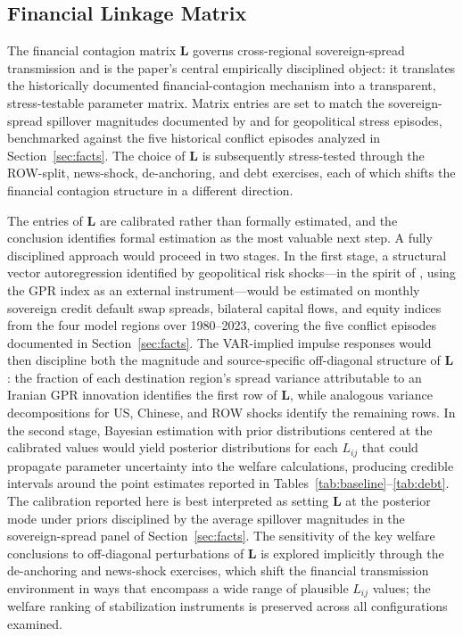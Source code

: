 \documentclass[12pt]{article}
\begin{document}
\subsection{Financial Linkage Matrix}

The financial contagion matrix $\mathbf{L}$ governs cross-regional sovereign-spread transmission and is the paper's central empirically disciplined object: it translates the historically documented financial-contagion mechanism into a transparent, stress-testable parameter matrix. Matrix entries are set to match the sovereign-spread spillover magnitudes documented by \citet{longstaff2011financial} and \citet{caldara2022measuring} for geopolitical stress episodes, benchmarked against the five historical conflict episodes analyzed in Section~\ref{sec:facts}. The choice of $\mathbf{L}$ is subsequently stress-tested through the ROW-split, news-shock, de-anchoring, and debt exercises, each of which shifts the financial contagion structure in a different direction.

The entries of $\mathbf{L}$ are calibrated rather than formally estimated, and the conclusion identifies formal estimation as the most valuable next step. A fully disciplined approach would proceed in two stages. In the first stage, a structural vector autoregression identified by geopolitical risk shocks---in the spirit of \citet{caldara2022measuring}, using the GPR index as an external instrument---would be estimated on monthly sovereign credit default swap spreads, bilateral capital flows, and equity indices from the four model regions over 1980--2023, covering the five conflict episodes documented in Section~\ref{sec:facts}. The VAR-implied impulse responses would then discipline both the magnitude and source-specific off-diagonal structure of $\mathbf{L}$: the fraction of each destination region's spread variance attributable to an Iranian GPR innovation identifies the first row of $\mathbf{L}$, while analogous variance decompositions for US, Chinese, and ROW shocks identify the remaining rows. In the second stage, Bayesian estimation with prior distributions centered at the calibrated values would yield posterior distributions for each $L_{ij}$ that could propagate parameter uncertainty into the welfare calculations, producing credible intervals around the point estimates reported in Tables~\ref{tab:baseline}--\ref{tab:debt}. The calibration reported here is best interpreted as setting $\mathbf{L}$ at the posterior mode under priors disciplined by the average spillover magnitudes in the sovereign-spread panel of Section~\ref{sec:facts}. The sensitivity of the key welfare conclusions to off-diagonal perturbations of $\mathbf{L}$ is explored implicitly through the de-anchoring and news-shock exercises, which shift the financial transmission environment in ways that encompass a wide range of plausible $L_{ij}$ values; the welfare ranking of stabilization instruments is preserved across all configurations examined.
\end{document}

